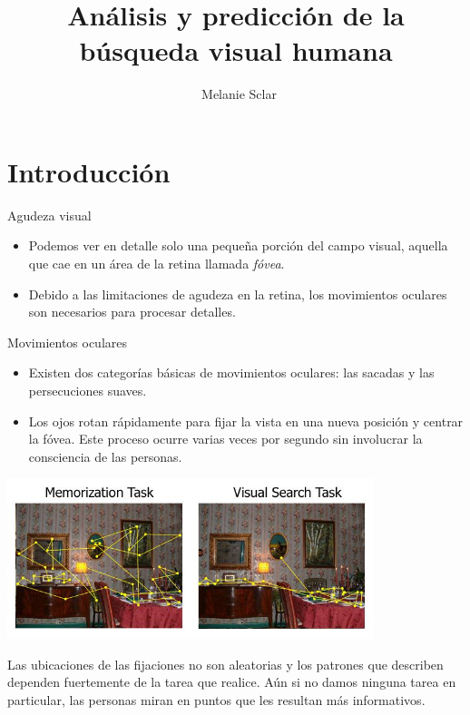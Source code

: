 \documentclass[compress]{beamer}
\title[Defensa de tesis de licenciatura] %
{Análisis y predicción de la búsqueda visual humana}
\author[Melanie Sclar] %
{~Melanie Sclar}
\institute[UBA] %
{
  Facultad de Ciencias Exactas y Naturales\\
  Universidad de Buenos Aires
}
\begin{document}
\begin{frame}
  \titlepage
\end{frame}

\section{Introducción}
\begin{frame}{Agudeza visual}
\begin{itemize}
\item Podemos ver en detalle solo una pequeña porción del campo visual, aquella que cae en un área de la retina llamada \textit{fóvea}.
\item Debido a las limitaciones de agudeza en la retina, los movimientos oculares son necesarios para procesar detalles.
\end{itemize}
\end{frame}

\begin{frame}{Movimientos oculares}
\begin{itemize}
\item Existen dos categorías básicas de movimientos oculares: las sacadas y las persecuciones suaves.
\item Los ojos rotan rápidamente para fijar la vista en una nueva posición y centrar la fóvea. Este proceso ocurre varias veces por segundo sin involucrar la consciencia de las personas.
\end{itemize}
\end{frame}

\begin{frame}
\begin{center}
\includegraphics[width=0.8\textwidth]{images/castelhano-fixations.jpg}
\end{center}

Las ubicaciones de las fijaciones no son aleatorias y los patrones que describen dependen fuertemente de la tarea que realice. Aún si no damos ninguna tarea en particular, las personas miran en puntos que les resultan más informativos.
\end{frame}
\end{document}
